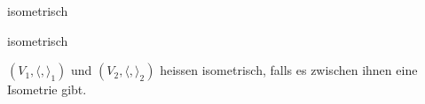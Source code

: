 \documentclass[class=article, crop=false]{standalone}
\begin{document}
\begin{zettel}{isometrisch}
\begin{flashcard}[1z96zwes]{isometrisch}
	\begin{definition}[isometrisch]
		$(V_1, \langle ,\rangle _1)$ und $(V_2, \langle ,\rangle _2)$ heissen isometrisch, falls es zwischen ihnen eine Isometrie gibt.
	\end{definition}
\end{flashcard}
\end{zettel}
\end{document}
